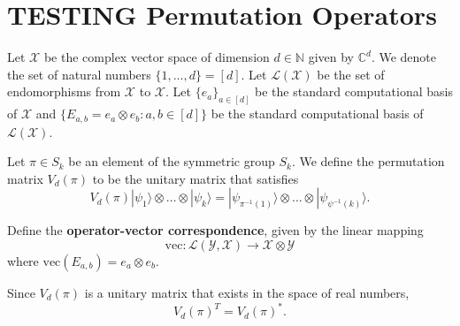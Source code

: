 \section{TESTING Permutation Operators}
Let $\mathcal{X}$ be the complex vector space of dimension $d \in \mathbb{N}$ given by $\mathbb{C}^{d}$.
We denote the set of natural numbers $\{1, \dots, d\} = [d]$.
Let $\mathcal{L}(\mathcal{X})$ be the set of endomorphisms from $\mathcal{X}$ to $\mathcal{X}$.
Let $\{e_a\}_{a \in [d]}$ be the standard computational basis of $\mathcal{X}$ and $\{E_{a, b} = e_{a} \otimes e_{b} : a, b \in [d] \}$ be the standard computational basis of $\mathcal{L}(\mathcal{X})$.

\begin{definition}
    Let $\pi \in S_{k}$ be an element of the symmetric group $S_{k}$.
    We define the permutation matrix $V_{d}(\pi)$ to be the unitary matrix that satisfies
    \begin{equation}
        V_{d}(\pi) |\psi_{1} \rangle \otimes \dots \otimes |\psi_{k} \rangle = |\psi_{\pi^{-1}(1)} \rangle \otimes \dots \otimes |\psi_{\psi^{-1}(k)} \rangle.
    \end{equation}
\end{definition}

\begin{definition}
    Define the \textbf{operator-vector correspondence}, given by the linear mapping
    \begin{equation}
        \text{vec}: \mathcal{L}(\mathcal{Y}, \mathcal{X}) \rightarrow \mathcal{X} \otimes \mathcal{Y}
    \end{equation}
    where $\text{vec}(E_{a, b}) = e_a \otimes e_b$.
\end{definition}

\begin{lemma}
    Since $V_{d}(\pi)$ is a unitary matrix that exists in the space of real numbers,
    \begin{equation}
        V_{d}(\pi)^{T} = V_{d}(\pi)^{*}.
    \end{equation}
\end{lemma}

